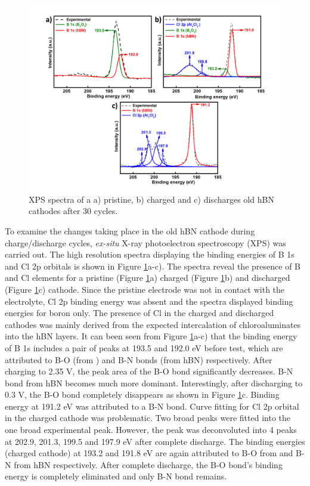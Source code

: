 \begin{figure}[tbh!]
\centering
\includegraphics[width=\textwidth]{Figures/BOhBN/oldhBNXPS}
\caption{XPS spectra of a a) pristine, b) charged and c) discharges old hBN cathodes after 30 cycles.}
\label{Figures/BOhBN:oldhBNXPS}
\end{figure}

To examine the changes taking place in the old hBN cathode during charge/discharge cycles, \textit{ex-situ} X-ray photoelectron spectroscopy (XPS) was carried out. The high resolution spectra displaying the binding energies of B 1s and Cl 2p orbitals is shown in Figure \ref{Figures/BOhBN:oldhBNXPS}a-c). The spectra reveal the presence of B and Cl elements for a pristine (Figure \ref{Figures/BOhBN:oldhBNXPS}a) charged (Figure \ref{Figures/BOhBN:oldhBNXPS}b) and discharged (Figure \ref{Figures/BOhBN:oldhBNXPS}c) cathode. Since the pristine electrode was not in contact with the electrolyte, Cl 2p binding energy was absent and the spectra displayed binding energies for boron only. The presence of Cl in the charged and discharged cathodes was mainly derived from the expected intercalation of chloroaluminates into the hBN layers. It can been seen from Figure \ref{Figures/BOhBN:oldhBNXPS}a-c) that the binding energy of B 1s includes a pair of peaks at 193.5 and 192.0 eV before test, which are attributed to B-O (from ) and B-N bonds (from hBN) respectively. After charging to 2.35 V, the peak area of the B-O bond significantly decreases. B-N bond from hBN becomes much more dominant. Interestingly, after discharging to 0.3 V, the B-O bond completely disappears as shown in Figure \ref{Figures/BOhBN:oldhBNXPS}c. Binding energy at 191.2 eV was attributed to a B-N bond. Curve fitting for Cl 2p orbital in the charged cathode was problematic. Two broad peaks were fitted into the one broad experimental peak. However, the peak was deconvoluted into 4 peaks at 202.9, 201.3, 199.5 and 197.9 eV after complete discharge. The binding energies (charged cathode) at 193.2 and 191.8 eV are again attributed to B-O from  and B-N from hBN respectively. After complete discharge, the B-O bond's binding energy is completely eliminated and only B-N bond remains.

